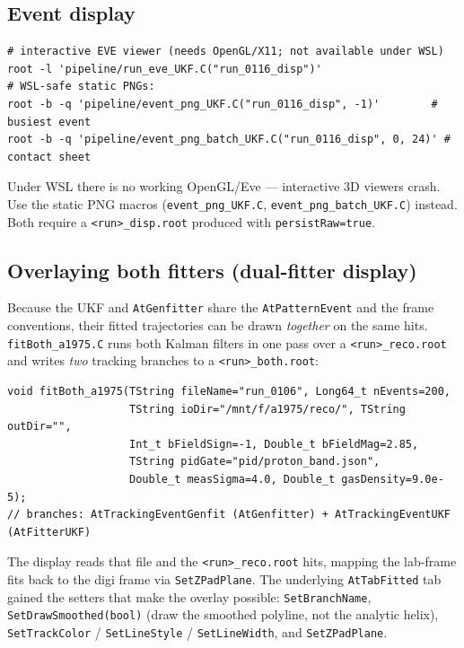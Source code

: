 \documentclass[11pt,a4paper]{article}
\newcommand{\code}[1]{\texttt{\small #1}}
\newcommand{\file}[1]{\texttt{\small #1}}
\begin{document}
\subsection{Event display}

\begin{lstlisting}[style=bash]
# interactive EVE viewer (needs OpenGL/X11; not available under WSL)
root -l 'pipeline/run_eve_UKF.C("run_0116_disp")'
# WSL-safe static PNGs:
root -b -q 'pipeline/event_png_UKF.C("run_0116_disp", -1)'        # busiest event
root -b -q 'pipeline/event_png_batch_UKF.C("run_0116_disp", 0, 24)' # contact sheet
\end{lstlisting}

\begin{warnbox}
Under WSL there is no working OpenGL/Eve --- interactive 3D viewers crash. Use the
static PNG macros (\file{event\_png\_UKF.C}, \file{event\_png\_batch\_UKF.C})
instead. Both require a \file{<run>\_disp.root} produced with \code{persistRaw=true}.
\end{warnbox}

\subsection{Overlaying both fitters (dual-fitter display)}\label{sec:dualdisp}

Because the UKF and \code{AtGenfitter} share the \code{AtPatternEvent} and the
frame conventions, their fitted trajectories can be drawn \emph{together} on the
same hits. \file{fitBoth\_a1975.C} runs both Kalman filters in one pass over a
\file{<run>\_reco.root} and writes \emph{two} tracking branches to a
\file{<run>\_both.root}:

\begin{lstlisting}
void fitBoth_a1975(TString fileName="run_0106", Long64_t nEvents=200,
                   TString ioDir="/mnt/f/a1975/reco/", TString outDir="",
                   Int_t bFieldSign=-1, Double_t bFieldMag=2.85,
                   TString pidGate="pid/proton_band.json",
                   Double_t measSigma=4.0, Double_t gasDensity=9.0e-5);
// branches: AtTrackingEventGenfit (AtGenfitter) + AtTrackingEventUKF (AtFitterUKF)
\end{lstlisting}

The display reads that file and the \file{<run>\_reco.root} hits, mapping the
lab-frame fits back to the digi frame via \code{SetZPadPlane}. The underlying
\code{AtTabFitted} tab gained the setters that make the overlay possible:
\code{SetBranchName}, \code{SetDrawSmoothed(bool)} (draw the smoothed polyline,
not the analytic helix), \code{SetTrackColor} / \code{SetLineStyle} /
\code{SetLineWidth}, and \code{SetZPadPlane}.
\end{document}
